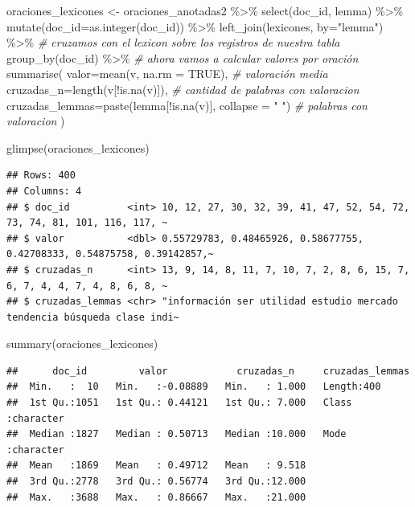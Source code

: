 \documentclass[
]{book}
\newenvironment{Shaded}{\begin{snugshade}}{\end{snugshade}}
\newcommand{\AttributeTok}[1]{\textcolor[rgb]{0.77,0.63,0.00}{#1}}
\newcommand{\CommentTok}[1]{\textcolor[rgb]{0.56,0.35,0.01}{\textit{#1}}}
\newcommand{\ConstantTok}[1]{\textcolor[rgb]{0.00,0.00,0.00}{#1}}
\newcommand{\FunctionTok}[1]{\textcolor[rgb]{0.00,0.00,0.00}{#1}}
\newcommand{\NormalTok}[1]{#1}
\newcommand{\OtherTok}[1]{\textcolor[rgb]{0.56,0.35,0.01}{#1}}
\newcommand{\SpecialCharTok}[1]{\textcolor[rgb]{0.00,0.00,0.00}{#1}}
\newcommand{\StringTok}[1]{\textcolor[rgb]{0.31,0.60,0.02}{#1}}
\begin{document}
\begin{Shaded}
\begin{Highlighting}[]
\NormalTok{oraciones\_lexicones }\OtherTok{\textless{}{-}}\NormalTok{ oraciones\_anotadas2 }\SpecialCharTok{\%\textgreater{}\%} 
  \FunctionTok{select}\NormalTok{(doc\_id, lemma) }\SpecialCharTok{\%\textgreater{}\%} 
  \FunctionTok{mutate}\NormalTok{(}\AttributeTok{doc\_id=}\FunctionTok{as.integer}\NormalTok{(doc\_id)) }\SpecialCharTok{\%\textgreater{}\%}
  \FunctionTok{left\_join}\NormalTok{(lexicones, }\AttributeTok{by=}\StringTok{"lemma"}\NormalTok{) }\SpecialCharTok{\%\textgreater{}\%} \CommentTok{\# cruzamos con el lexicon sobre los registros de nuestra tabla}
  \FunctionTok{group\_by}\NormalTok{(doc\_id) }\SpecialCharTok{\%\textgreater{}\%} \CommentTok{\# ahora vamos a calcular valores por oración}
  \FunctionTok{summarise}\NormalTok{(}
    \AttributeTok{valor=}\FunctionTok{mean}\NormalTok{(v, }\AttributeTok{na.rm =} \ConstantTok{TRUE}\NormalTok{), }\CommentTok{\# valoración media}
    \AttributeTok{cruzadas\_n=}\FunctionTok{length}\NormalTok{(v[}\SpecialCharTok{!}\FunctionTok{is.na}\NormalTok{(v)]), }\CommentTok{\# cantidad de palabras con valoracion}
    \AttributeTok{cruzadas\_lemmas=}\FunctionTok{paste}\NormalTok{(lemma[}\SpecialCharTok{!}\FunctionTok{is.na}\NormalTok{(v)], }\AttributeTok{collapse =} \StringTok{" "}\NormalTok{) }\CommentTok{\# palabras con valoracion}
\NormalTok{  ) }

\FunctionTok{glimpse}\NormalTok{(oraciones\_lexicones)}
\end{Highlighting}
\end{Shaded}

\begin{verbatim}
## Rows: 400
## Columns: 4
## $ doc_id          <int> 10, 12, 27, 30, 32, 39, 41, 47, 52, 54, 72, 73, 74, 81, 101, 116, 117, ~
## $ valor           <dbl> 0.55729783, 0.48465926, 0.58677755, 0.42708333, 0.54875758, 0.39142857,~
## $ cruzadas_n      <int> 13, 9, 14, 8, 11, 7, 10, 7, 2, 8, 6, 15, 7, 6, 7, 4, 4, 7, 4, 8, 6, 8, ~
## $ cruzadas_lemmas <chr> "información ser utilidad estudio mercado tendencia búsqueda clase indi~
\end{verbatim}

\begin{Shaded}
\begin{Highlighting}[]
\FunctionTok{summary}\NormalTok{(oraciones\_lexicones)}
\end{Highlighting}
\end{Shaded}

\begin{verbatim}
##      doc_id         valor            cruzadas_n     cruzadas_lemmas   
##  Min.   :  10   Min.   :-0.08889   Min.   : 1.000   Length:400        
##  1st Qu.:1051   1st Qu.: 0.44121   1st Qu.: 7.000   Class :character  
##  Median :1827   Median : 0.50713   Median :10.000   Mode  :character  
##  Mean   :1869   Mean   : 0.49712   Mean   : 9.518                     
##  3rd Qu.:2778   3rd Qu.: 0.56774   3rd Qu.:12.000                     
##  Max.   :3688   Max.   : 0.86667   Max.   :21.000
\end{verbatim}
\end{document}
